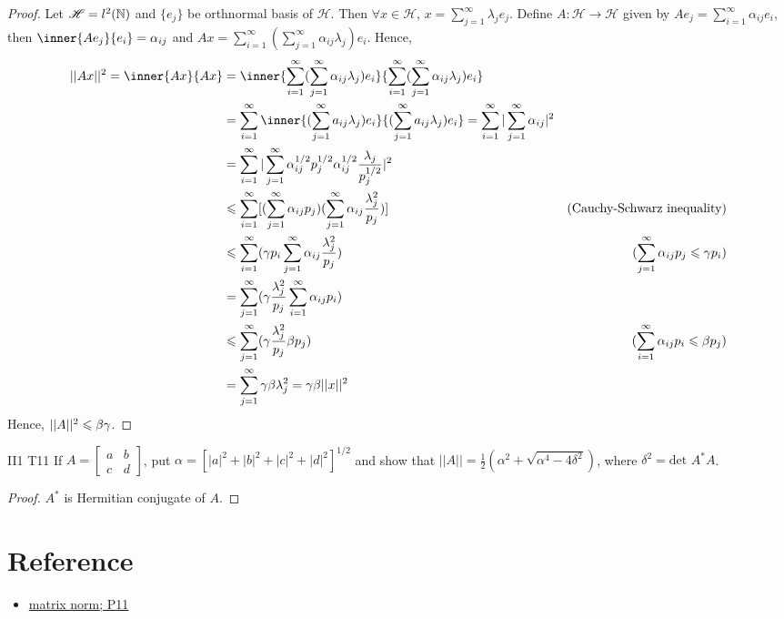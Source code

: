 \begin{proof}
    Let $\mathscr{H}=l^2(\mathbb{N})$ and $\{e_j\}$ be orthnormal basis of $\mathscr{H}$.
    Then $\forall x\in \mathscr{H}$, $x=\sum\limits_{j=1}^{\infty}\lambda_je_j$.
    Define $A:\mathscr{H}\rightarrow \mathscr{H}$ given by $Ae_j=\sum\limits_{i=1}^{\infty}\alpha_{ij}e_i$,
    then $\inner{Ae_j}{e_i}=\alpha_{ij}$ and $Ax=\sum\limits_{i=1}^{\infty}(\sum\limits_{j=1}^{\infty}\alpha_{ij}\lambda_j)e_i$. Hence,
    \begin{align*}
        ||Ax||^2=\inner{Ax}{Ax}&=\inner{\sum\limits_{i=1}^{\infty}(\sum\limits_{j=1}^{\infty}\alpha_{ij}\lambda_j)e_i}{\sum\limits_{i=1}^{\infty}(\sum\limits_{j=1}^{\infty}\alpha_{ij}\lambda_j)e_i}\\
                                &=\sum\limits_{i=1}^{\infty}\inner{(\sum\limits_{j=1}^{\infty}a_{ij}\lambda_j)e_i}{(\sum\limits_{j=1}^{\infty}a_{ij}\lambda_j)e_i}= \sum\limits_{i=1}^{\infty}|\sum\limits_{j=1}^{\infty}\alpha_{ij}|^2\\
                                &= \sum\limits_{i=1}^{\infty}|\sum\limits_{j=1}^{\infty}\alpha_{ij}^{1/2}p_j^{1/2}\alpha_{ij}^{1/2}\frac{\lambda_j}{p_j^{1/2}}|^2\\
                                &\leqs \sum\limits_{i=1}^{\infty}[(\sum\limits_{j=1}^{\infty}\alpha_{ij}p_j)(\sum\limits_{j=1}^{\infty}\alpha_{ij}\frac{\lambda_j^2}{p_j})] & (\text{Cauchy-Schwarz inequality})\\
                                &\leqs \sum\limits_{i=1}^{\infty}(\gamma p_i\sum\limits_{j=1}^{\infty} \alpha_{ij}\frac{\lambda_j^2}{p_j})&(\sum\limits_{j=1}^{\infty}\alpha_{ij}p_j \leqs \gamma p_i)\\
                                &=\sum\limits_{j=1}^{\infty}(\gamma \frac{\lambda_j^2}{p_j}\sum\limits_{i=1}^{\infty}\alpha_{ij}p_i)\\
                                &\leqs \sum\limits_{j=1}^{\infty} (\gamma \frac{\lambda_j^2}{p_j}\beta p_j)&(\sum\limits_{i=1}^{\infty}\alpha_{ij}p_i \leqs \beta p_j)\\
                                &=\sum\limits_{j=1}^{\infty}\gamma\beta\lambda_j^2=\gamma\beta||x||^2
    \end{align*}
    Hence, $||A||^2\leqslant \beta\gamma$.
\end{proof}

\begin{exercise}{II1 T11}{}
    If $A=\begin{bmatrix}
        a&b \\
        c&d
      \end{bmatrix}$, put $\alpha=[|a|^2+|b|^2+|c|^2+|d|^2]^{1/2}$ and
      show that $||A||=\frac{1}{2}(\alpha^2+\sqrt{\alpha^4-4\delta^2})$,
      where $\delta^2=\text{det }A^*A$.
\end{exercise}

\begin{proof}
    $A^*$ is Hermitian conjugate of $A$.
\end{proof}

\section{Reference}

\begin{itemize}
    \item \href{https://ocw.mit.edu/courses/6-241j-dynamic-systems-and-control-spring-2011/04fddfbcb1eb933ecca85dab8bfbb171_MIT6_241JS11_chap04.pdf}{matrix norm; P11}
\end{itemize}

